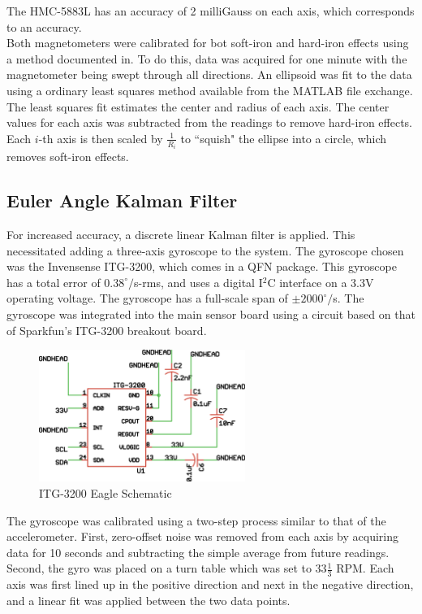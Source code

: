  The HMC-5883L has an accuracy of 2 milliGauss on each axis, which corresponds to an accuracy.\\

 Both magnetometers were calibrated for bot soft-iron and hard-iron effects using a method documented in\cite{magCalibration}.
 To do this, data was acquired for one minute with the magnetometer being swept through all directions. An ellipsoid was fit to the data using a ordinary least squares method available from the MATLAB file exchange\cite{ellipsoidFit}.
 The least squares fit estimates the center and radius of each axis. The center values for each axis was subtracted from the readings to remove hard-iron effects. Each $i$-th axis is then scaled by $\frac{1}{R_i}$ to ``squish" the ellipse into a circle, which removes soft-iron effects.
\subsection*{Euler Angle Kalman Filter}
For increased accuracy, a discrete linear Kalman filter is applied. This necessitated adding a three-axis gyroscope to the system. The gyroscope chosen was the Invensense ITG-3200, which comes in a QFN package. This gyroscope has a total error of $0.38^\circ/$s-rms\cite{itg3200DataSheet}, and uses a digital I$^2$C interface on a 3.3V operating voltage. The gyroscope has a full-scale span of $\pm2000^\circ/$s. The gyroscope was integrated into the main sensor board using a circuit based on that of Sparkfun's ITG-3200 breakout board\cite{itg3200BOBSchematic}.

\begin{figure}[h!]
  \caption{ITG-3200 Eagle Schematic} \label{itg3200Schematic}
  \centering
    \includegraphics[width=0.6\textwidth]{figures/itg3200Schematic.eps}
\end{figure}

The gyroscope was calibrated using a two-step process similar to that of the accelerometer. First, zero-offset noise was removed from each axis by acquiring data for 10 seconds and subtracting the simple average from future readings. Second, the gyro was placed on a turn table which was set to $33 \frac{1}{3}$ RPM. Each axis was first lined up in the positive direction and next in the negative direction, and a linear fit was applied between the two data points.\\

